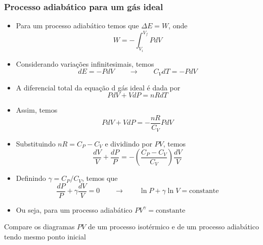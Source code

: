 \documentclass[t,%
brazilian,%
11pt,%
aspectratio=169,%
table%
]{beamer}
\begin{document}
\begin{frame}
    \frametitle{Processo adiabático para um gás ideal}
    \begin{itemize}
        \item Para um processo adiabático temos que $\Delta E = W$, onde 
            \[
                W=-\int_{V_i}^{V_f} PdV
            \]

        \item Considerando variações infinitesimais, temos
            \[
                dE = -PdV \qquad \rightarrow \qquad C_V dT = -PdV
            \]

        \item A diferencial total da equação d gás ideal é dada por
            \[
                PdV + VdP = nRdT
            \]
    \end{itemize}
\end{frame}

\begin{frame}
    \begin{itemize}
        \item Assim, temos
            \[
                PdV + VdP = -\frac{nR}{C_V}PdV
            \]
        \item Substituindo $nR=C_P-C_V$ e dividindo por $PV$, temos
            \[
                \frac{dV}{V} + \frac{dP}{P} = - \left(\frac{C_P-C_V}{C_V}\right)\frac{dV}{V}
            \]
        \item Definindo $\gamma = C_P/C_V$, temos que
            \[
                \frac{dP}{P}+\gamma\frac{dV}{V}=0 \qquad\rightarrow\qquad
                \ln{P}+\gamma\ln{V}=\text{constante}
            \]

        \item Ou seja, para um processo adiabático $PV^\gamma = \text{constante}$
    \end{itemize}
    \pause
    \begin{block}{}
        Compare os diagramas $PV$ de um processo isotérmico e de um processo
        adiabático tendo mesmo ponto inicial
    \end{block}
\end{frame}
\end{document}

